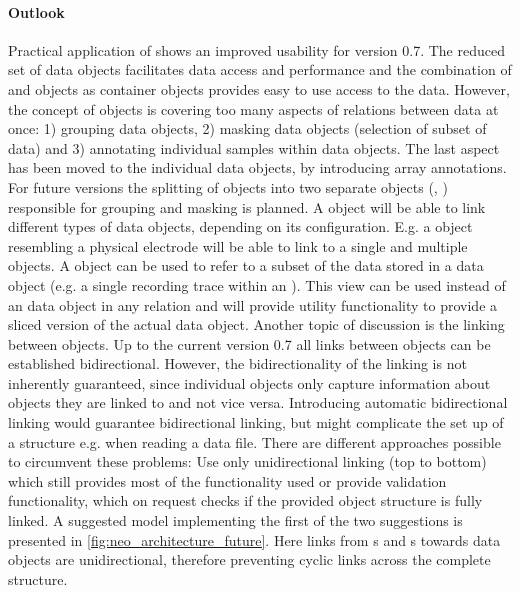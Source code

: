 \paragraph{Outlook}
Practical application of  shows an improved usability for version 0.7. The reduced set of data objects facilitates data access and performance and the combination of  and  objects as container objects provides easy to use access to the data. However, the concept of  objects is covering too many aspects of relations between data at once: 1) grouping data objects, 2) masking data objects (selection of subset of data) and 3) annotating individual samples within data objects. The last aspect has been moved to the individual data objects, by introducing array annotations. 
For future versions the splitting of  objects into two separate objects (, ) responsible for grouping and masking is planned. A  object will be able to link different types of data objects, depending on its configuration. E.g. a  object resembling a physical electrode will be able to link to a single  and multiple  objects. A  object can be used to refer to a subset of the data stored in a data object (e.g. a single recording trace within an ). This view can be used instead of an data object in any relation and will provide utility functionality to provide a sliced version of the actual data object.
Another topic of discussion is the linking between  objects. Up to the current version 0.7 all links between  objects can be established bidirectional. However, the bidirectionality of the linking is not inherently guaranteed, since individual  objects only capture information about objects they are linked to and not vice versa. Introducing automatic bidirectional linking would guarantee bidirectional linking, but might complicate the set up of a  structure e.g. when reading a data file. There are different approaches possible to circumvent these problems: Use only unidirectional linking (top to bottom) which still provides most of the functionality used or provide validation functionality, which on request checks if the provided  object structure is fully linked. A suggested model implementing the first of the two suggestions is presented in \cref{fig:neo_architecture_future}. Here links from s and s towards data objects are unidirectional, therefore preventing cyclic links across the complete  structure. 
